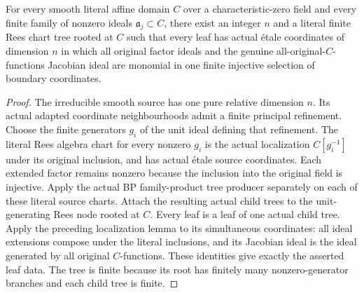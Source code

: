 \begin{theorem}\label{thm:sc0-smooth-family-rees-tree}
\leanok
{}
For every smooth literal affine domain $C$ over a characteristic-zero field
and every finite family of nonzero ideals $\mathfrak a_j\subset C$, there
exist an integer $n$ and a literal finite Rees chart tree rooted at $C$ such
that every leaf has actual \'etale coordinates of dimension $n$ in which all
original factor ideals and the genuine all-original-$C$-functions Jacobian
ideal are monomial in one finite injective selection of boundary coordinates.
\end{theorem}
\begin{proof}
The irreducible smooth source has one pure relative dimension $n$. Its actual
adapted coordinate neighbourhoods admit a finite principal refinement. Choose
the finite generators $g_i$ of the unit ideal defining that refinement. The
literal Rees algebra chart for every nonzero $g_i$ is the actual localization
$C[g_i^{-1}]$ under its original inclusion, and has actual \'etale source
coordinates. Each extended factor remains nonzero because the inclusion into
the original field is injective. Apply the actual BP family-product tree
producer separately on each of these literal source charts. Attach the
resulting actual child trees to the unit-generating Rees node rooted at $C$.
Every leaf is a leaf of one actual child tree. Apply the preceding localization
lemma to its simultaneous coordinates: all ideal extensions compose under
the literal inclusions, and its Jacobian ideal is the ideal generated by all
original $C$-functions. These identities give exactly the asserted leaf data.
The tree is finite because its root has finitely many nonzero-generator
branches and each child tree is finite.
\end{proof}
